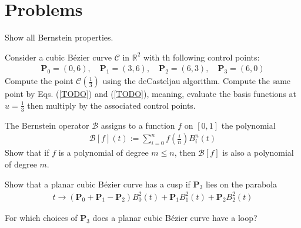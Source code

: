 




\section{Problems}
\label{sec:cad-bezier-problems}

\begin{exercise}
  Show all Bernstein properties.
\end{exercise}

\begin{exercise}
  Consider a cubic B\'ezier curve $\mathcal{C}$ in $\mathbb{R}^2$ with th following control points:
  \begin{align*}
    \mathbf{P}_0 = \left(0, 6 \right), \quad
    \mathbf{P}_1 = \left(3, 6 \right), \quad
    \mathbf{P}_2 = \left(6, 3 \right), \quad
    \mathbf{P}_3 = \left(6, 0 \right)
  \end{align*}
  Compute the point $\mathcal{C}(\frac{1}{3})$ using the deCasteljau algorithm. Compute the same point by Eqs. (\ref{TODO}) and (\ref{TODO}), meaning, evaluate the basis functions at $u=\frac{1}{3}$ then multiply by the associated control points.
\end{exercise}

\begin{exercise}
  The Bernstein operator $\mathcal{B}$ assigns to a function $f$ on $[0,1]$ the polynomial
  \begin{align*}
    \mathcal{B}[f](t) := \sum\limits_{i=0}^n f(\frac{i}{n}) B_i^n(t)
  \end{align*}
  Show that if $f$ is a polynomial of degree $m \leq n$, then $\mathcal{B}[f]$ is also a polynomial of degree $m$.
\end{exercise}

\begin{exercise}
  Show that a planar cubic B\'ezier curve has a cusp if $\mathbf{P}_3$ lies on the parabola
  \begin{align*}
    t \rightarrow \left( \mathbf{P}_0 + \mathbf{P}_1 - \mathbf{P}_2 \right) B_0^2(t) + \mathbf{P}_1 B_1^2(t) + \mathbf{P}_2 B_2^2(t)    
  \end{align*}
\end{exercise}

\begin{exercise}
  For which choices of $\mathbf{P}_3 $ does a planar cubic B\'ezier curve have a loop?
\end{exercise}

